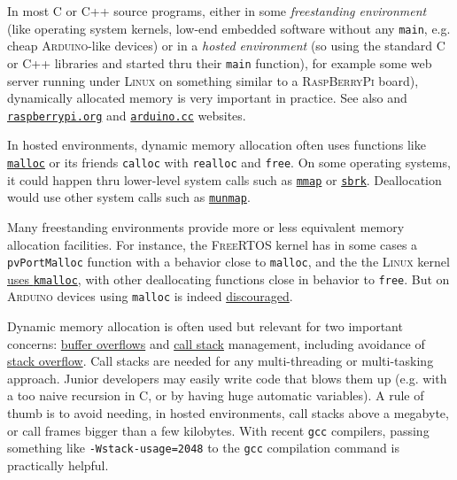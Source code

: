  \medskip

 In most C or C++ source programs, either in some \emph{freestanding
 environment} (like operating system kernels, low-end embedded
 software without any \texttt{main}, e.g. cheap
  \textsc{Arduino}-like
 devices) or in a \emph{hosted environment} (so using the standard C
 or C++ libraries and started thru their \texttt{main} function), for
 example some web server running under \textsc{Linux} on something
 similar to a 
 \textsc{RaspBerryPi} board), dynamically allocated memory is very
 important in practice. See also \cite{karvinen:2014:make} and
 \href{https://www.raspberrypi.org/}{\texttt{raspberrypi.org}} and
 \href{https://www.arduino.cc/}{\texttt{arduino.cc}} websites.

 In hosted environments, dynamic memory allocation often uses
 functions like
 \href{https://man7.org/linux/man-pages/man3/malloc.3.html}{\texttt{malloc}}
 or its friends \texttt{calloc} with \texttt{realloc} and
 \texttt{free}. On some operating systems, it could happen thru
 lower-level system calls such as
 \href{https://man7.org/linux/man-pages/man2/mmap.2.html}{\texttt{mmap}}
 or
 \href{https://man7.org/linux/man-pages/man2/sbrk.2.html}{\texttt{sbrk}}. Deallocation
 would use other system calls such as
 \href{https://man7.org/linux/man-pages/man2/munmap.2.html}{\texttt{munmap}}.

 Many freestanding environments provide more or less equivalent memory
 allocation facilities. For instance,
  the \textsc{FreeRTOS}
 kernel has in some cases a \texttt{pvPortMalloc} function with a
 behavior close to \texttt{malloc}, and the
  the \textsc{Linux} kernel
 \href{http://www.jikos.cz/jikos/Kmalloc_Internals.html}{uses
   \texttt{kmalloc}}, with other deallocating functions close in
 behavior to \texttt{free}. But on  \textsc{Arduino} devices using \texttt{malloc} is indeed
 \href{https://arduino.stackexchange.com/q/682/12068}{discouraged}.

 Dynamic memory allocation is often used but relevant for two
 important concerns:  
 \href{https://en.wikipedia.org/wiki/Buffer_overflow}{buffer
   overflows} and \href{https://en.wikipedia.org/wiki/Call_stack}{call
   stack} management, including avoidance of
 \href{https://en.wikipedia.org/wiki/Stack_overflow}{stack
   overflow}. Call stacks are needed for any multi-threading or
 multi-tasking approach. Junior developers may easily write code that
 blows them up (e.g. with a too naive recursion in C, or by having
 huge automatic variables). A rule of thumb is to avoid needing, in
 hosted environments, call stacks above a megabyte, or call frames
 bigger than a few kilobytes. With recent \texttt{gcc} compilers,
  passing
 something like \texttt{-Wstack-usage=2048} to the \texttt{gcc}
 compilation command is practically helpful.


